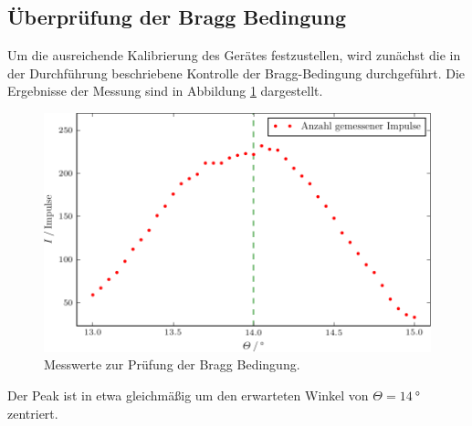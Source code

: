 
\subsection{Überprüfung der Bragg Bedingung}
Um die ausreichende Kalibrierung des Gerätes festzustellen, wird zunächst die in der Durchführung beschriebene Kontrolle der Bragg-Bedingung durchgeführt.
Die Ergebnisse der Messung sind in Abbildung \ref{fig:plot1} dargestellt.
\begin{figure}
  \centering
  \includegraphics{build/plot_1.pdf}
  \caption{Messwerte zur Prüfung der Bragg Bedingung.}
  \label{fig:plot1}
\end{figure}
Der Peak ist in etwa gleichmäßig um den erwarteten Winkel von $\Theta = \SI{14}{\degree}$ zentriert.

